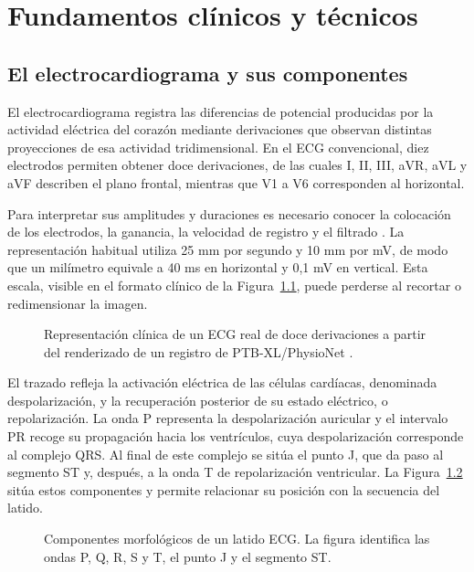 \chapter{Fundamentos clínicos y técnicos}
\label{chap:fundamentos}

\section{El electrocardiograma y sus componentes}
\label{sec:componentes_ecg}

El electrocardiograma registra las diferencias de potencial producidas por la actividad eléctrica del corazón mediante derivaciones que observan distintas proyecciones de esa actividad tridimensional. En el ECG convencional, diez electrodos permiten obtener doce derivaciones, de las cuales I, II, III, aVR, aVL y aVF describen el plano frontal, mientras que V1 a V6 corresponden al horizontal.

Para interpretar sus amplitudes y duraciones es necesario conocer la colocación de los electrodos, la ganancia, la velocidad de registro y el filtrado \cite{kligfield2007}. La representación habitual utiliza 25 mm por segundo y 10 mm por mV, de modo que un milímetro equivale a 40 ms en horizontal y 0,1 mV en vertical. Esta escala, visible en el formato clínico de la Figura~\ref{fig:signal_to_image}, puede perderse al recortar o redimensionar la imagen.

\begin{figure}[H]
  \centering
  \caption{Representación clínica de un ECG real de doce derivaciones a partir del renderizado de un registro de PTB-XL/PhysioNet \cite{wagner2020}.}
  \label{fig:signal_to_image}
\end{figure}

El trazado refleja la activación eléctrica de las células cardíacas, denominada despolarización, y la recuperación posterior de su estado eléctrico, o repolarización. La onda P representa la despolarización auricular y el intervalo PR recoge su propagación hacia los ventrículos, cuya despolarización corresponde al complejo QRS. Al final de este complejo se sitúa el punto J, que da paso al segmento ST y, después, a la onda T de repolarización ventricular. La Figura~\ref{fig:morfologia_ecg} sitúa estos componentes y permite relacionar su posición con la secuencia del latido.

\begin{figure}[H]
  \centering
  \caption{Componentes morfológicos de un latido ECG. La figura identifica las ondas P, Q, R, S y T, el punto J y el segmento ST.}
  \label{fig:morfologia_ecg}
\end{figure}

